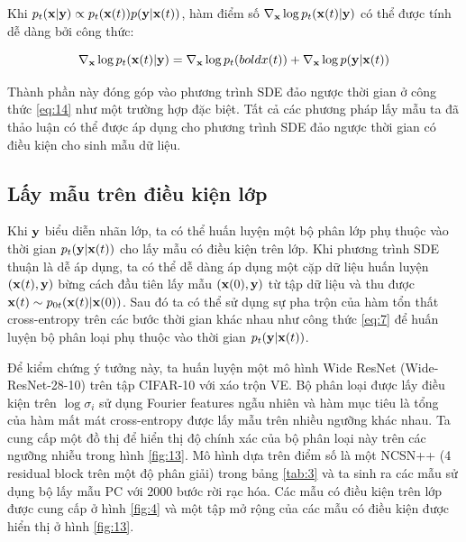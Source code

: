 \documentclass{article} %
\begin{document}
Khi $p_t (\bold{x} \vert \bold{y}) \propto p_t(\bold{x}(t)) p(\bold{y} \vert \bold{x}(t))$, hàm điểm số $\nabla_{\bold{x}} \log p_t (\bold{x}(t) \vert \bold{y})$ có thể được tính dễ dàng bởi công thức:

\begin{equation} \label{eq:49}
    \nabla_{\bold{x}} \log p_t (\bold{x}(t) \vert \bold{y}) = \nabla_{\bold{x}} \log p_t(bold{x}(t)) + \nabla_{\bold{x}} \log p(\bold{y} \vert \bold{x}(t))
\end{equation}

Thành phần này đóng góp vào phương trình SDE đảo ngược thời gian ở công thức \ref{eq:14} như một trường hợp đặc biệt.
Tất cả các phương pháp lấy mẫu ta đã thảo luận có thể được áp dụng cho phương trình SDE đảo ngược thời gian có điều kiện cho sinh mẫu dữ liệu.

\subsection{Lấy mẫu trên điều kiện lớp} \label{I.1}

Khi $\bold{y}$ biểu diễn nhãn lớp, ta có thể huấn luyện một bộ phân lớp phụ thuộc vào thời gian $p_t(\bold{y} \vert \bold{x}(t))$ cho lấy mẫu có điều kiện trên lớp.
Khi phương trình SDE thuận là dễ áp dụng, ta có thể dễ dàng áp dụng một cặp dữ liệu huấn luyện $(\bold{x}(t), \bold{y})$ bừng cách đầu tiên lấy mẫu $(\bold{x}(0), \bold{y})$ từ tập dữ liệu và thu được $\bold{x}(t) \sim p_{0t}(\bold{x}(t) \vert \bold{x}(0))$.
Sau đó ta có thể sử dụng sự pha trộn của hàm tổn thất cross-entropy trên các bước thời gian khác nhau như công thức \ref{eq:7} để huấn luyện bộ phân loại phụ thuộc vào thời gian $p_t(\bold{y} \vert \bold{x}(t))$.

Để kiểm chứng ý tưởng này, ta huấn luyện một mô hình Wide ResNet \citep{zagoruyko2016wide} (Wide-ResNet-28-10) trên tập CIFAR-10 với xáo trộn VE.
Bộ phân loại được lấy điều kiện trên $\log \sigma_i$ sử dụng Fourier features ngẫu nhiên \citep{tancik2020fourier} và hàm mục tiêu là tổng của hàm mất mát cross-entropy được lấy mẫu trên nhiều ngưỡng khác nhau.
Ta cung cấp một đồ thị để hiển thị độ chính xác của bộ phân loại này trên các ngưỡng nhiễu trong hình \ref{fig:13}.
Mô hình dựa trên điểm số là một NCSN++ (4 residual block trên một độ phân giải) trong bảng \ref{tab:3} và ta sinh ra các mẫu sử dụng bộ lấy mẫu PC với 2000 bước rời rạc hóa.
Các mẫu có điều kiện trên lớp được cung cấp ở hình \ref{fig:4} và một tập mở rộng của các mẫu có điều kiện được hiển thị ở hình \ref{fig:13}.
\end{document}
